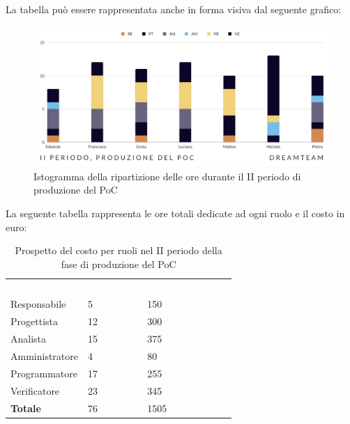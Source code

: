 La tabella può essere rappresentata anche in forma visiva dal seguente grafico:
\begin{figure}[H]
\centering
\includegraphics[scale=0.65]{Sezioni/SezioniPreventivo/grafici/Poc_II_periodo.png}
\caption{Istogramma della ripartizione delle ore durante il II periodo di produzione del PoC}
\end{figure}

La seguente tabella rappresenta le ore totali dedicate ad ogni ruolo e il costo in euro:

\begin{table}[H]
\begin{center}
\renewcommand{\arraystretch}{1.5}
\begin{tabular}{ m{}<{\centering}  m{}<{\centering} m{}<{\centering}}
	\rowcolor{darkblue}
	\textcolor{white}{\textbf{Ruolo}}&\textcolor{white}{\textbf{Totale ore}}&\textcolor{white}{\textbf{Costo totale (\euro)}}\\ 

	Responsabile  & 5 & 150 \\	
	
	Progettista & 12 & 300 \\
	
	Analista & 15 & 375 \\

	Amministratore & 4 & 80 \\
	
	Programmatore & 17 & 255 \\
	
	Verificatore & 23 & 345 \\
	
	\textbf{Totale} & 76 & 1505 \\
	
\end{tabular}
\caption{Prospetto del costo per ruoli nel II periodo della fase di produzione del PoC}
\end{center}
\end{table}

